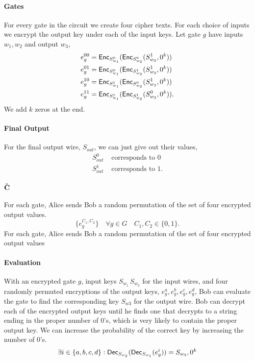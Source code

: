 \paragraph{Gates}
For every gate in the circuit we create four cipher texts. 
For each choice of inputs we encrypt the output key under each of the input keys. 
Let gate $g$ have inputs $w_1, w_2$ and output $w_3$,
\begin{align*}
e_g^{00} &= \mathsf{Enc}_{S_{w_1}^0} ( \mathsf{Enc}_{S_{w_2}^0}  ( S_{w_3}^1, 0^k) )\\
e_g^{01} &= \mathsf{Enc}_{S_{w_1}^0} ( \mathsf{Enc}_{S_{w_2}^1}  ( S_{w_3}^1, 0^k) )\\
e_g^{10} &= \mathsf{Enc}_{S_{w_1}^1} ( \mathsf{Enc}_{S_{w_2}^0}  ( S_{w_3}^1, 0^k) )\\
e_g^{11} &= \mathsf{Enc}_{S_{w_1}^1} ( \mathsf{Enc}_{S_{w_2}^1}  ( S_{w_3}^0, 0^k) ).
\end{align*}
We add $k$ zeros at the end.

\paragraph{Final Output}
For the final output wire, $S_{out}$, we can just give out their values,
\begin{align*}
S_{out}^0 &\text{ corresponds to 0}\\
S_{out}^1 &\text{ corresponds to 1.}
\end{align*}

\paragraph{$\bold{\tilde{C}}$}
For each gate, Alice sends Bob a random permutation of the set of four encrypted output values.
\[
\{e_g^{C_1, C_2} \} \quad \forall g \in G \quad C_1, C_2 \in \{0,1\}.
\]
For each gate, Alice sends Bob a random permutation of the set of four encrypted output values

\paragraph{Evaluation}
With an encrypted gate $g$,
input keys $S_{w_1} \, S_{w_2}$ for the input wires,
and four randomly permuted encryptions of the output keys, $e_g^{a}, e_g^{b}, e_g^{c}, e_g^{d}$,
Bob can evaluate the gate to find the corresponding key $S_{w3}$ for the output wire.
Bob can decrypt each of the encrypted output keys until he finds one that decrypts 
to a string ending in the proper number of $0$'s, which is very likely to contain the proper output key.
We can increase the probability of the correct key by increasing the number of $0$'s. 
\[
\exists  i \in \{a, b, c, d\} : \mathsf{Dec}_{S_{w_2}} ( \mathsf{Dec}_{S_{w_1}} ( e_g^{i} ))  = S_{w_3}, 0^k
\]

